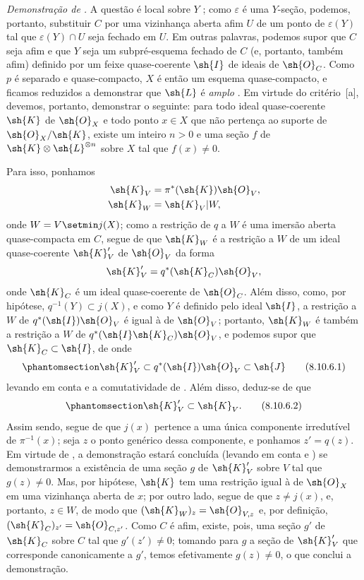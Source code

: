 \documentclass[oneside,10pt]{amsart}
\newcommand{\oldpage}[2][]{\marginnote{\normalfont\footnotesize\textbf{#1}~|~#2}\ignorespaces}
\let\EGAOriginalLabel\label
\renewcommand{\label}[1]{\phantomsection\EGAOriginalLabel{#1}}
\begin{document}
\begin{env}[8.10.6]
\label{II.8.10.6}
\emph{Demonstração de .}
A questão é local sobre $Y$ ;
como $\varepsilon$ é uma $Y$-seção, podemos, portanto, substituir $C$ por uma vizinhança aberta afim $U$ de um ponto de $\varepsilon(Y)$ tal que $\varepsilon(Y)\cap U$ seja fechado em $U$.
Em outras palavras, podemos supor que $C$ seja afim e que $Y$ seja um subpré-esquema fechado de $C$ (e, portanto, também afim) definido por um feixe quase-coerente
\oldpage[II]{188}
$\sh{I}$ de ideais de $\sh{O}_C$.
Como $p$ é separado e quase-compacto, $X$ é então um esquema quase-compacto, e ficamos reduzidos a demonstrar que $\sh{L}$ é \emph{amplo} .
Em virtude do critério~[a], devemos, portanto, demonstrar o seguinte:
para todo ideal quase-coerente $\sh{K}$ de $\sh{O}_X$ e todo ponto $x\in X$ que não pertença ao suporte de $\sh{O}_X/\sh{K}$, existe um inteiro $n>0$ e uma seção $f$ de $\sh{K}\otimes\sh{L}^{\otimes n}$ sobre $X$ tal que $f(x)\neq0$.

Para isso, ponhamos
\begin{align*}
  \sh{K}_V &= \pi^*(\sh{K})\sh{O}_V,\\
  \sh{K}_W &= \sh{K}_V|W,
\end{align*}
onde $W=V\setmin j(X)$;
como a restrição de $q$ a $W$ é uma imersão aberta quase-compacta em $C$, segue de  que $\sh{K}_W$ é a restrição a $W$ de um ideal quase-coerente $\sh{K}'_V$ de $\sh{O}_V$ da forma
\[
    \sh{K}'_V = q^*(\sh{K}_C)\sh{O}_V,
\]
onde $\sh{K}_C$ é um ideal quase-coerente de $\sh{O}_C$.
Além disso, como, por hipótese, $q^{-1}(Y)\subset j(X)$, e como $Y$ é definido pelo ideal $\sh{I}$, a restrição a $W$ de $q^*(\sh{I})\sh{O}_V$ é igual à de $\sh{O}_V$; portanto, $\sh{K}_W$ é também a restrição a $W$ de $q^*(\sh{I}\sh{K}_C)\sh{O}_V$, e podemos supor que $\sh{K}_C\subset\sh{I}$, de onde
\[
\label{II.8.10.6.1}
    \sh{K}'_V \subset q^*(\sh{I})\sh{O}_V \subset \sh{J}
\tag{8.10.6.1}
\]
levando em conta  e a comutatividade de .
Além disso, deduz-se de  que
\[
\label{II.8.10.6.2}
    \sh{K}'_V \subset \sh{K}_V.
\tag{8.10.6.2}
\]
Assim sendo, segue de  que $j(x)$ pertence a uma única componente irredutível de $\pi^{-1}(x)$;
seja $z$ o ponto genérico dessa componente, e ponhamos $z'=q(z)$.
Em virtude de , a demonstração estará concluída (levando em conta  e ) se demonstrarmos a existência de uma seção $g$ de $\sh{K}'_V$ sobre $V$ tal que $g(z)\neq0$.
Mas, por hipótese, $\sh{K}$ tem uma restrição igual à de $\sh{O}_X$ em uma vizinhança aberta de $x$;
por outro lado, segue de  que $z\neq j(x)$, e, portanto, $z\in W$, de modo que $(\sh{K}_W)_z=\sh{O}_{V,z}$ e, por definição, $(\sh{K}_C)_{z'}=\sh{O}_{C,z'}$.
Como $C$ é afim, existe, pois, uma seção $g'$ de $\sh{K}_C$ sobre $C$ tal que $g'(z')\neq0$; tomando para $g$ a seção de $\sh{K}'_V$ que corresponde canonicamente a $g'$, temos efetivamente $g(z)\neq0$, o que conclui a demonstração.
\end{env}
\end{document}
